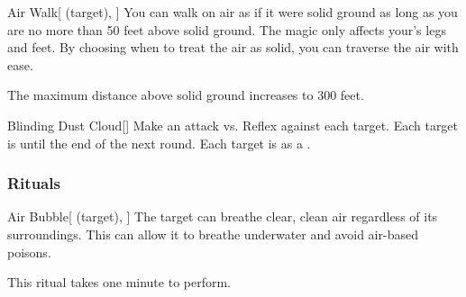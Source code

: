 \lowercase{\hypertarget{spell:Air Walk}{}}\label{spell:Air Walk}
\begin{attuneability}[Rank 6]{\hypertarget{spell:Air Walk}{Air Walk}}[ (target), ]
You can walk on air as if it were solid ground as long as you are no more than 50 feet above solid ground.
The magic only affects your's legs and feet.
By choosing when to treat the air as solid, you can traverse the air with ease.

\rankline
{} The maximum distance above solid ground increases to 300 feet.
\end{attuneability}
\vspace{0.25em}



\lowercase{\hypertarget{spell:Blinding Dust Cloud}{}}\label{spell:Blinding Dust Cloud}
\begin{freeability}[Rank 7]{\hypertarget{spell:Blinding Dust Cloud}{Blinding Dust Cloud}}[]
Make an attack vs. Reflex against each target.
\hit Each target is  until the end of the next round.
\crit Each target is  as a .
\end{freeability}
\vspace{0.25em}



\subsubsection{Rituals}


\lowercase{\hypertarget{spell:Air Bubble}{}}\label{spell:Air Bubble}
\begin{attuneability}[Rank 3]{\hypertarget{spell:Air Bubble}{Air Bubble}}[ (target), ]
The target can breathe clear, clean air regardless of its surroundings.
This can allow it to breathe underwater and avoid air-based poisons.

This ritual takes one minute to perform.
\end{attuneability}
\vspace{0.25em}



